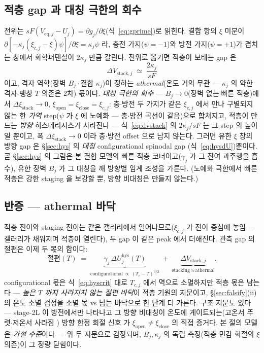 \documentclass[11pt,a4paper]{article}
\newcommand{\eq}{\mathrm{eq}}
\newcommand{\hys}{\mathrm{hys}}
\begin{document}
\subsection{적층 gap 과 대칭 극한의 회수}
전위는 $sF(V_{\eq,j}-U_j)=\partial g_j/\partial\xi$(식~\eqref{eq:gprime})로 읽힌다. 결합 항의 $\xi$ 미분이
$\partial[-\kappa_j(\xi_{c,j}-\xi)\psi]/\partial\xi=\kappa_j\psi$ 라, 충전 가지($\psi=-1$)와 방전
가지($\psi=+1$)가 겹치는 창에서 화학퍼텐셜이 $2\kappa_j$ 만큼 갈린다. 전위로 옮기면 적층이 보태는 gap 은
\begin{equation}
\Delta V_{\mathrm{stack},j}\;\simeq\;\frac{2\kappa_j}{sF}
\label{eq:dvstack}
\end{equation}
이고, 격자 역학(장벽 $B_j\cdot$결합 $\kappa_j$)이 정하는 \emph{athermal}(온도 거의 무관 — $\kappa_j$ 의 약한 격자-팽창 $T$ 의존은 2차) 몫이다.
\emph{대칭 극한의 회수} — $B_j\to0$(장벽 없는$\cdot$빠른 적층)에서 $\Delta\xi_{\mathrm{stack}}\to0$,
$\xi_{\mathrm{open}}=\xi_{\mathrm{close}}=\xi_{c,j}$: 충$\cdot$방전 두 가지가 같은 $\xi_{c,j}$ 에서
만나 구별되지 않는 한 \emph{가역} step($\psi$ 가 $\xi$ 에 노예화 — 충$\cdot$방전 곡선이 같음)으로 합쳐지고, 적층이 만드는
\emph{방향} 히스테리시스가 사라진다 — 식~\eqref{eq:dvstack} 의 $2\kappa_j/sF$ 는 그 step 의 높이일
뿐이고, 폭 $\Delta\xi_{\mathrm{stack}}\to0$ 이라 충$\cdot$방전 offset 으로 남지 않는다. 그러면 유한
$\xi$ 창의 방향 gap 은 \S\ref{sec:hys} 의 \emph{대칭} configurational spinodal gap
(식~\eqref{eq:hysdU})뿐이다. 곧 \S\ref{sec:hys} 의 그림은 본 결합 모델의 빠른-적층
코너이고($\gamma_j$ 가 그 잔여 과주행을 흡수), 유한 장벽 $B_j$ 가 그 대칭을 깨 방향별 임계 조성을
가른다. (노예화 극한에서 빠른 적층은 강한 staging 을 보강할 뿐, 방향 비대칭은 만들지 않는다.)

\subsection{반증 — athermal 바닥}
적층 전이와 staging 전이는 같은 갤러리에서 일어나므로($\xi_{c,j}$ 가 전이 중심에 놓임 — 갤러리가
채워지며 적층이 열린다), 두 gap 이 같은 peak 에서 더해진다. 관측 gap 의 절편은 이제 두 몫의 합이다:
\begin{equation}
\text{절편}(T)\;=\;
\underbrace{\gamma_j\,\Delta U_j^\hys(T)}_{\text{configurational}\,\propto\,(T_c-T)^{3/2}}
\;+\;\underbrace{\Delta V_{\mathrm{stack},j}}_{\text{stacking}\,\approx\,\text{athermal}}.
\label{eq:gapsplit}
\end{equation}
configurational 몫은 식~\eqref{eq:hyscrit} 대로 $T_{c,j}$ 에서 멱으로 소멸하지만 적층 몫은 남는다 —
\emph{높은 $T$ 까지 사라지지 않는 절편 바닥}이 적층 기원의 지문이고, \S\ref{sec:falsify}(ii) 의 온도
소멸 검정을 소멸 몫 vs 남는 바닥으로 한 단계 더 가른다. 구조 지문도 있다 — stage-2L 이 방전에서만
나타나고 그 방향 비대칭이 온도에 게이트되는(고온서 뚜렷$\cdot$저온서 사라짐 \cite{schmitt2022}) 방향
한정 회절 신호 \cite{didier2020} 가 $\xi_{\mathrm{open}}\ne\xi_{\mathrm{close}}$
의 직접 증거다. 본 절의 모델은 \emph{가설 수준}이다 — 위 두 지문으로 검정되며, $B_j,\kappa_j$ 의 독립
측정(적층 민감 회절의 $\xi$ 의존)이 그 정량 닫힘이다.
\end{document}
